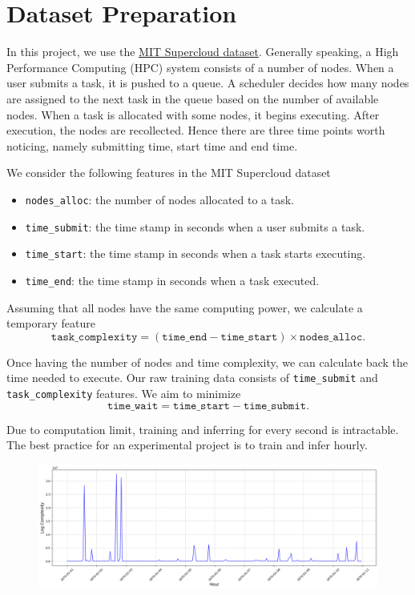 \section{Dataset Preparation}
In this project, we use the \href{https://www.kaggle.com/datasets/skylarkphantom/mit-datacenter-challenge-data?select=scheduler_data.csv}{MIT Supercloud dataset}. Generally speaking, a High Performance Computing (HPC) system consists of a number of nodes. When a user submits a task, it is pushed to a queue. A scheduler decides how many nodes are assigned to the next task in the queue based on the number of available nodes. When a task is allocated with some nodes, it begins executing. After execution, the nodes are recollected. Hence there are three time points worth noticing, namely submitting time, start time and end time.

We consider the following features in the MIT Supercloud dataset
\begin{itemize}
  \item \texttt{nodes\_alloc}: the number of nodes allocated to a task.
  \item \texttt{time\_submit}: the time stamp in seconds when a user submits a task.
  \item \texttt{time\_start}: the time stamp in seconds when a task starts executing.
  \item \texttt{time\_end}: the time stamp in seconds when a task executed.
\end{itemize}

Assuming that all nodes have the same computing power, we calculate a temporary feature $$\texttt{task\_complexity} = (\texttt{time\_end} - \texttt{time\_start})\times \texttt{nodes\_alloc}.$$

Once having the number of nodes and time complexity, we can calculate back the time needed to execute. Our raw training data consists of \texttt{time\_submit} and \texttt{task\_complexity} features. We aim to minimize
$$\texttt{time\_wait} = \texttt{time\_start} - \texttt{time\_submit}.$$

Due to computation limit, training and inferring for every second is intractable. The best practice for an experimental project is to train and infer hourly.

\begin{figure}[ht]
  \includegraphics[width=\textwidth]{img/hourly.png}
\end{figure}